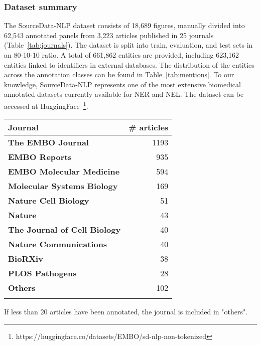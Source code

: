 \documentclass{bioinfo}
\begin{document}
\begin{methods}
\subsubsection{Dataset summary}

The SourceData-NLP dataset consists of 18,689 figures, manually divided into 62,543 annotated panels from 3,223 articles published in 25 journals (Table~\ref{tab:journals}). The dataset is split into train, evaluation, and test sets in an 80-10-10 ratio.  A total of  661,862 entities are provided, including 623,162 entities linked to identifiers in external databases. The distribution of the entities across the annotation classes can be found in Table~\ref{tab:mentions}. To our knowledge, SourceData-NLP represents one of the most extensive biomedical annotated datasets currently available for NER and NEL. The dataset can be accessed at HuggingFace~\citep{huggingface}\footnote{https://huggingface.co/datasets/EMBO/sd-nlp-non-tokenized}. 

\begin{table}[!t]
 {

    \begin{tabular}{@{}l|r@{}}\toprule 
    \textbf{Journal}                    & \textbf{\# articles}\\\midrule
    \textbf{The EMBO Journal}           & 1193\\
    \textbf{EMBO Reports}               & 935 \\
    \textbf{EMBO Molecular Medicine}    & 594 \\
    \textbf{Molecular Systems Biology}  & 169 \\
    \textbf{Nature Cell Biology }       & 51 \\
    \textbf{Nature}                     & 43 \\
    \textbf{The Journal of Cell Biology}& 40 \\
    \textbf{Nature Communications}      & 40 \\
    \textbf{BioRXiv}                    & 38\\
    \textbf{PLOS Pathogens}             & 28 \\
    \textbf{Others}                     & 102\\\botrule
    \end{tabular}}{If less than 20 articles have been annotated, the journal
    is included in "others".}
\end{table}



\end{methods}
\end{document}
